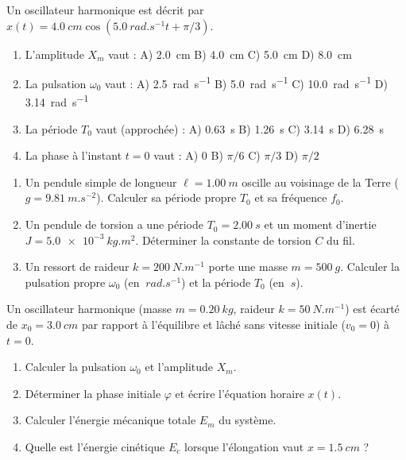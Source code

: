 \documentclass[11pt]{article}
\begin{document}
\begin{exercice}
Un oscillateur harmonique est décrit par $x(t) = \SI{4,0}{cm} \cos( \SI{5,0}{rad.s^{-1}} t + \pi/3 )$.
\begin{enumerate}
    \item L'amplitude $X_m$ vaut : \quad A) \SI{2,0}{cm} \quad B) \SI{4,0}{cm} \quad C) \SI{5,0}{cm} \quad D) \SI{8,0}{cm}
    \item La pulsation $\omega_0$ vaut : \quad A) \SI{2,5}{rad.s^{-1}} \quad B) \SI{5,0}{rad.s^{-1}} \quad C) \SI{10,0}{rad.s^{-1}} \quad D) \SI{3,14}{rad.s^{-1}}
    \item La période $T_0$ vaut (approchée) : \quad A) \SI{0,63}{s} \quad B) \SI{1,26}{s} \quad C) \SI{3,14}{s} \quad D) \SI{6,28}{s}
    \item La phase à l'instant $t=0$ vaut : \quad A) $0$ \quad B) $\pi/6$ \quad C) $\pi/3$ \quad D) $\pi/2$
\end{enumerate}
\end{exercice}

\begin{exercice}
\begin{enumerate}
    \item Un pendule simple de longueur $\ell = \SI{1,00}{m}$ oscille au voisinage de la Terre ($g=\SI{9,81}{m.s^{-2}}$). Calculer sa période propre $T_0$ et sa fréquence $f_0$.
    \item Un pendule de torsion a une période $T_0 = \SI{2,00}{s}$ et un moment d'inertie $J = \SI{5,0e-3}{kg.m^2}$. Déterminer la constante de torsion $C$ du fil.
    \item Un ressort de raideur $k = \SI{200}{N.m^{-1}}$ porte une masse $m = \SI{500}{g}$. Calculer la pulsation propre $\omega_0$ (en $\SI{}{rad.s^{-1}}$) et la période $T_0$ (en $\SI{}{s}$).
\end{enumerate}
\end{exercice}

\begin{exercice}
Un oscillateur harmonique (masse $m=\SI{0,20}{kg}$, raideur $k=\SI{50}{N.m^{-1}}$) est écarté de $x_0 = \SI{3,0}{cm}$ par rapport à l'équilibre et lâché sans vitesse initiale ($v_0=0$) à $t=0$.
\begin{enumerate}
    \item Calculer la pulsation $\omega_0$ et l'amplitude $X_m$.
    \item Déterminer la phase initiale $\varphi$ et écrire l'équation horaire $x(t)$.
    \item Calculer l'énergie mécanique totale $E_m$ du système.
    \item Quelle est l'énergie cinétique $E_c$ lorsque l'élongation vaut $x = \SI{1,5}{cm}$ ?
\end{enumerate}
\end{exercice}
\end{document}
